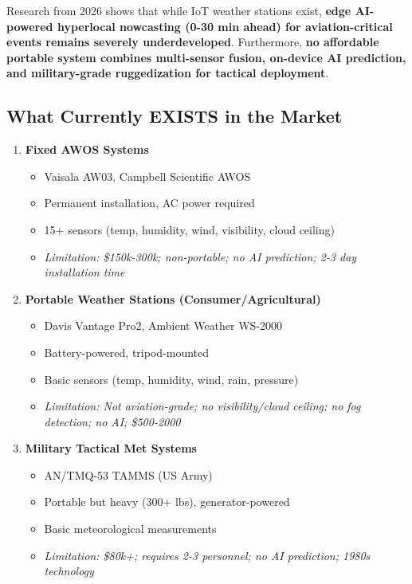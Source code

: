 Research from 2026 shows that while IoT weather stations exist, \textcolor{missingcolor}{\textbf{edge AI-powered hyperlocal nowcasting (0-30 min ahead) for aviation-critical events remains severely underdeveloped}}. Furthermore, \textcolor{missingcolor}{\textbf{no affordable portable system combines multi-sensor fusion, on-device AI prediction, and military-grade ruggedization for tactical deployment}}.

\subsection{What Currently EXISTS in the Market}

\begin{enumerate}[leftmargin=*]
    \item \textcolor{existingcolor}{\textbf{Fixed AWOS Systems}}
    \begin{itemize}
        \item Vaisala AW03, Campbell Scientific AWOS
        \item Permanent installation, AC power required
        \item 15+ sensors (temp, humidity, wind, visibility, cloud ceiling)
        \item \textit{Limitation: \$150k-300k; non-portable; no AI prediction; 2-3 day installation time}
    \end{itemize}
    
    \item \textcolor{existingcolor}{\textbf{Portable Weather Stations (Consumer/Agricultural)}}
    \begin{itemize}
        \item Davis Vantage Pro2, Ambient Weather WS-2000
        \item Battery-powered, tripod-mounted
        \item Basic sensors (temp, humidity, wind, rain, pressure)
        \item \textit{Limitation: Not aviation-grade; no visibility/cloud ceiling; no fog detection; no AI; \$500-2000}
    \end{itemize}
    
    \item \textcolor{existingcolor}{\textbf{Military Tactical Met Systems}}
    \begin{itemize}
        \item AN/TMQ-53 TAMMS (US Army)
        \item Portable but heavy (300+ lbs), generator-powered
        \item Basic meteorological measurements
        \item \textit{Limitation: \$80k+; requires 2-3 personnel; no AI prediction; 1980s technology}
    \end{itemize}
    

\end{enumerate}
